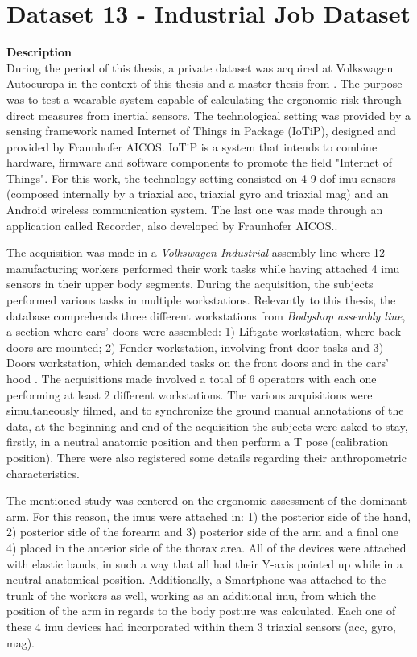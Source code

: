 \section{Dataset 13 - Industrial Job Dataset}
\label{sec:industry}
\textbf{Description}\\
During the period of this thesis, a private dataset was acquired at Volkswagen Autoeuropa in the context of this thesis and a master thesis from \cite{santos2019}. The purpose was to test a wearable system capable of calculating the ergonomic risk through direct measures from inertial sensors. The technological setting was provided by a sensing framework named Internet of Things in Package (IoTiP), designed and provided by Fraunhofer AICOS. IoTiP is a system that intends to combine hardware, firmware and software components to promote the field "Internet of Things"\cite{FraunhoferAICOS}. For this work, the technology setting consisted on 4 9-\gls{dof} \gls{imu} sensors (composed internally by a triaxial \gls{acc}, triaxial \gls{gyro} and triaxial \gls{mag}) and an Android wireless communication system. The last one was made through an application called Recorder, also developed by Fraunhofer AICOS.\cite{santos2019}.
\par
The acquisition was made in a \textit{Volkswagen Industrial} assembly line where 12 manufacturing workers performed their work tasks while having attached 4 \gls{imu} sensors in their upper body segments. During the acquisition, the subjects performed various tasks in multiple workstations. Relevantly to this thesis, the database comprehends three different workstations from \textit{Bodyshop assembly line}, a section where cars' doors were assembled: 1) Liftgate workstation, where back doors are mounted; 2) Fender workstation, involving front door tasks and 3) Doors workstation, which demanded tasks on the front doors and in the cars' hood \cite{santos2019}. The acquisitions made involved a total of 6 operators with each one performing at least 2 different workstations. The various acquisitions were simultaneously filmed, and to synchronize the ground manual annotations of the data, at the beginning and end of the acquisition the subjects were asked to stay, firstly, in a neutral anatomic position and then perform a T pose (calibration position). There were also registered some details regarding their anthropometric characteristics.
\par
The mentioned study was centered on the ergonomic assessment of the dominant arm. For this reason, the \gls{imu}s  were attached in: 1) the posterior side of the hand, 2) posterior side of the forearm and 3) posterior side of the arm and a final one 4) placed in the anterior side of the thorax area. All of the devices were attached with elastic bands, in such a way that all had their Y-axis pointed up while in a neutral anatomical position. Additionally, a Smartphone was attached to the trunk of the workers as well, working as an additional \gls{imu}, from which the position of the arm in regards to the body posture was calculated. Each one of these 4 \gls{imu} devices had incorporated within them 3 triaxial sensors (\gls{acc}, \gls{gyro}, \gls{mag}).\\

